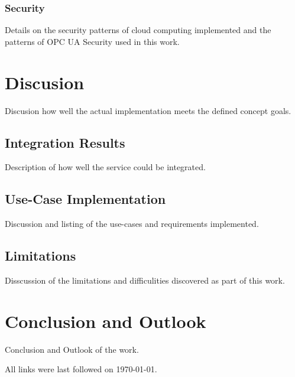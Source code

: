 \documentclass[
a4paper,
twoside,
headsepline,
cleardoublepage=empty,
parskip=half,
draft=false
]{scrbook}
\begin{document}
			\subsection{Security} \label{subsec:security}
			
				Details on the security patterns of cloud computing implemented and the patterns of OPC UA Security used in this work.
				
	\chapter{Discusion} \label{ch:discusion}
	
		Discusion how well the actual implementation meets the defined concept goals.
		
		\section{Integration Results}\label{sec:integration_results}
		
			Description of how well the service could be integrated.
			
		\section{Use-Case Implementation}\label{sec:use_cases_implementation}
		
			Discussion and listing of the use-cases and requirements implemented.
			
		\section{Limitations}\label{sec:limitations}
		
			Disscussion of the limitations and difficulities discovered as part of this work.
		
	\chapter{Conclusion and Outlook} \label{ch:conclusion_and_outlook}
	
		Conclusion and Outlook of the work.
		
	\clearpage
	
	
	\printbibliography
	
	All links were last followed on \today.
	
	\pagestyle{empty}
	\renewcommand*{\chapterpagestyle}{empty}
	\Versicherung
	
\end{document}
